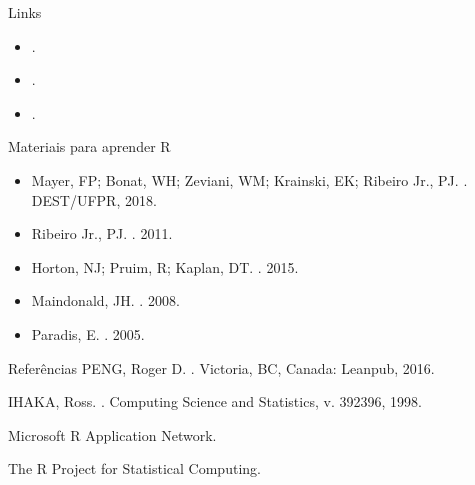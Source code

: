 \documentclass[
  ignorenonframetext,
  serif,
  professionalfont,
  usenames,
  dvipsnames,
  aspectratio = 169]{beamer}
\def\beginAHalfColumn{\begin{minipage}{0.49\textwidth}}%
\def\endColumns{\end{minipage}}%
\begin{document}
\begin{frame}{Links}
\protect\hypertarget{links}{}
\beginAHalfColumn

\begin{itemize}
\item
  \href{https://cran.r-project.org/}{\color{blue}{The Comprehensive R Archive Network}}.
\item
  \href{https://posit.co/download/rstudio-desktop/}{\color{blue}{RStudio Desktop}}.
\item
  \href{https://posit.cloud/plans/free}{\color{blue}{Posit Cloud}}.
\end{itemize}

\endColumns
\beginAHalfColumn

\endColumns
\end{frame}

\begin{frame}{Materiais para aprender R}
\protect\hypertarget{materiais-para-aprender-r}{}
\begin{itemize}
\item
  Mayer, FP; Bonat, WH; Zeviani, WM; Krainski, EK; Ribeiro Jr., PJ.
  \href{http://cursos.leg.ufpr.br/ecr/}{\color{blue}{Estatística Computacional com R}}.
  DEST/UFPR, 2018.
\item
  Ribeiro Jr., PJ.
  \href{http://www.leg.ufpr.br/~paulojus/embrapa/Rembrapa/}{\color{blue}{Introdução ao Ambiente Estatístico R}}.
  2011.
\item
  Horton, NJ; Pruim, R; Kaplan, DT.
  \href{http://cran-r.c3sl.ufpr.br/doc/contrib/Horton+Pruim+Kaplan_MOSAIC-StudentGuide.pdf}{\color{blue}{A Student's Guide to R}}.
  2015.
\item
  Maindonald, JH.
  \href{http://cran-r.c3sl.ufpr.br/doc/contrib/usingR.pdf}{\color{blue}{Using R for Data Analysis and Graphics}}.
  2008.
\item
  Paradis, E.
  \href{http://cran-r.c3sl.ufpr.br/doc/contrib/Paradis-rdebuts_en.pdf}{\color{blue}{R for Beginners}}.
  2005.
\end{itemize}
\end{frame}

\begin{frame}{Referências}
\protect\hypertarget{referuxeancias}{}
PENG, Roger D.
\href{https://bookdown.org/rdpeng/rprogdatascience/}{\color{blue}{R programming for data science}}.
Victoria, BC, Canada: Leanpub, 2016.

IHAKA, Ross.
\href{https://www.stat.auckland.ac.nz/~ihaka/downloads/Interface98.pdf}{\color{blue}{R: Past and future history}}.
Computing Science and Statistics, v. 392396, 1998.

Microsoft R Application Network.
\href{https://mran.microsoft.com/documents/what-is-r}{\color{blue}{What is R?}}

The R Project for Statistical Computing.
\href{https://www.r-project.org/about.html}{\color{blue}{What is R?}}
\end{frame}
\end{document}
